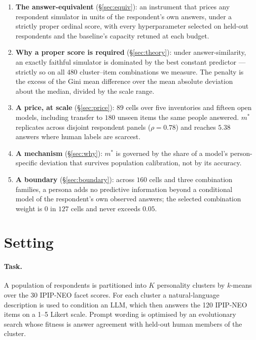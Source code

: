 \documentclass[11pt]{article}
\begin{document}
\begin{enumerate}\itemsep2pt
\item \textbf{The answer-equivalent} (\S\ref{sec:equiv}): an instrument that
prices any respondent simulator in units of the respondent's own answers, under a
strictly proper ordinal score, with every hyperparameter selected on held-out
respondents and the baseline's capacity retuned at each budget.
\item \textbf{Why a proper score is required} (\S\ref{sec:theory}): under
answer-similarity, an exactly faithful simulator is dominated by the best
constant predictor --- strictly so on all $480$ cluster--item combinations we
measure. The penalty is the excess of the Gini mean difference over the mean
absolute deviation about the median, divided by the scale range.
\item \textbf{A price, at scale} (\S\ref{sec:price}): $89$ cells over five
inventories and fifteen open models, including transfer to $180$ unseen items the
same people answered. $m^{*}$ replicates across disjoint respondent panels
($\rho{=}0.78$) and reaches $5.38$ answers where human labels are scarcest.
\item \textbf{A mechanism} (\S\ref{sec:why}): $m^{*}$ is governed by the
share of a model's person-specific deviation that survives population
calibration, not by its accuracy.
\item \textbf{A boundary} (\S\ref{sec:boundary}): across $160$ cells and three
combination families, a persona adds no predictive information beyond a
conditional model of the respondent's own observed answers; the selected
combination weight is $0$ in $127$ cells and never exceeds $0.05$.
\end{enumerate}

\section{Setting}
\label{sec:setting}

\paragraph{Task.} A population of respondents is partitioned into $K$ personality
clusters by $k$-means over the 30 IPIP-NEO facet scores. For each cluster a
natural-language description is used to condition an LLM, which then answers the
120 IPIP-NEO items on a 1--5 Likert scale. Prompt wording is optimised by an
evolutionary search whose fitness is answer agreement with held-out human
members of the cluster.
\end{document}
